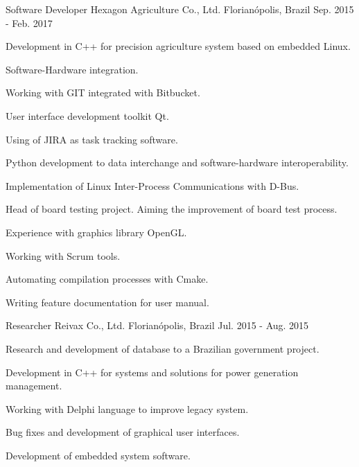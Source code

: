 \begin{cventries}
  \cventry
    {Software Developer} %
    {Hexagon Agriculture Co., Ltd.} %
    {Florianópolis, Brazil} %
    {Sep. 2015 - Feb. 2017} %
    {
      \begin{cvitems} %
        \item {Development in C++ for precision agriculture system based on embedded Linux.}
        \item {Software-Hardware integration.}
        \item {Working with GIT integrated with Bitbucket.}
        \item {User interface development toolkit Qt.}
        \item {Using of JIRA as task tracking software.}
        \item {Python development to data interchange and software-hardware interoperability.}
        \item {Implementation of Linux Inter-Process Communications with D-Bus.}
        \item {Head of board testing project. Aiming the improvement of board test process.}
        \item {Experience with graphics library OpenGL.}
        \item {Working with Scrum tools.}
        \item {Automating compilation processes with Cmake.}
        \item {Writing feature documentation for user manual.}
      \end{cvitems}
    }

  \cventry
    {Researcher} %
    {Reivax Co., Ltd.} %
    {Florianópolis, Brazil} %
    {Jul. 2015 - Aug. 2015} %
    {
      \begin{cvitems} %
        \item {Research and development of database to a Brazilian government project.}
        \item {Development in C++ for systems and solutions for power generation management.}
        \item {Working with Delphi language to improve legacy system.}
        \item {Bug fixes and development of graphical user interfaces.}
        \item {Development of embedded system software.}
      \end{cvitems}
    }


\end{cventries}
